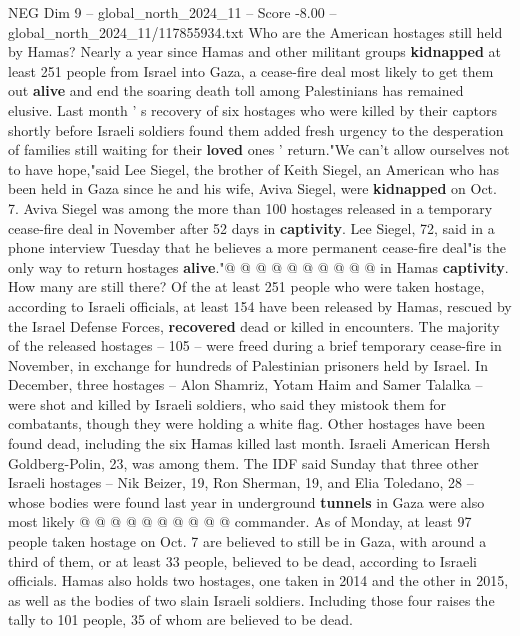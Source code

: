 \begin{textsample}{NEG Dim 9 – global\_north\_2024\_11 – Score -8.00 – global\_north\_2024\_11/117855934.txt}  \label{ex:f9_neg_201}
Who are the American hostages still held by Hamas?
Nearly a year since Hamas and other militant groups \textbf{kidnapped} at least 251 people from Israel into Gaza, a cease-fire deal most likely to get them out \textbf{alive} and end the soaring death toll among Palestinians has remained elusive.
Last month ' s recovery of six hostages who were killed by their captors shortly before Israeli soldiers found them added fresh urgency to the desperation of families still waiting for their \textbf{loved} ones ' return."We can't allow ourselves not to have hope,"said Lee Siegel, the brother of Keith Siegel, an American who has been held in Gaza since he and his wife, Aviva Siegel, were \textbf{kidnapped} on Oct. 7.
Aviva Siegel was among the more than 100 hostages released in a temporary cease-fire deal in November after 52 days in \textbf{captivity}.
Lee Siegel, 72, said in a phone interview Tuesday that he believes a more permanent cease-fire deal"is the only way to return hostages \textbf{alive}."@ @ @ @ @ @ @ @ @ @ in Hamas \textbf{captivity}.
How many are still there?
Of the at least 251 people who were taken hostage, according to Israeli officials, at least 154 have been released by Hamas, rescued by the Israel Defense Forces, \textbf{recovered} dead or killed in encounters.
The majority of the released hostages -- 105 -- were freed during a brief temporary cease-fire in November, in exchange for hundreds of Palestinian prisoners held by Israel.
In December, three hostages -- Alon Shamriz, Yotam Haim and Samer Talalka -- were shot and killed by Israeli soldiers, who said they mistook them for combatants, though they were holding a white flag.
Other hostages have been found dead, including the six Hamas killed last month.
Israeli American Hersh Goldberg-Polin, 23, was among them.
The IDF said Sunday that three other Israeli hostages -- Nik Beizer, 19, Ron Sherman, 19, and Elia Toledano, 28 -- whose bodies were found last year in underground \textbf{tunnels} in Gaza were also most likely @ @ @ @ @ @ @ @ @ @ commander.
As of Monday, at least 97 people taken hostage on Oct. 7 are believed to still be in Gaza, with around a third of them, or at least 33 people, believed to be dead, according to Israeli officials.
Hamas also holds two hostages, one taken in 2014 and the other in 2015, as well as the bodies of two slain Israeli soldiers.
Including those four raises the tally to 101 people, 35 of whom are believed to be dead.

\end{textsample}
